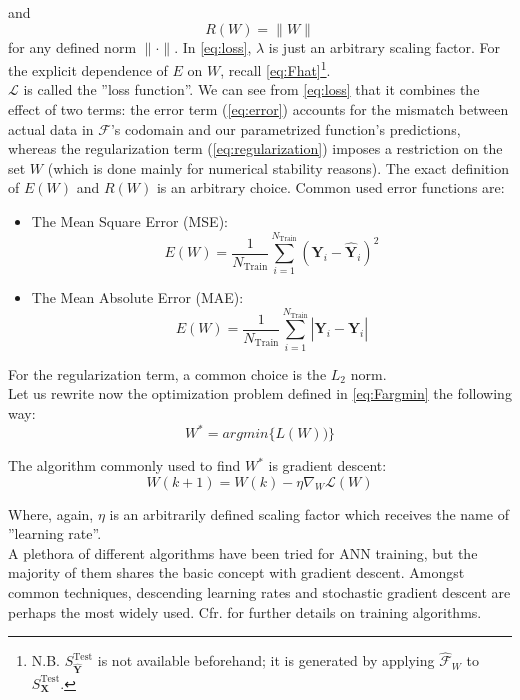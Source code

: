 and
\begin{equation}\label{eq:regularization}
	R(W) = \|W\|
\end{equation}
for any defined norm $\|\cdot\|$. In \autoref{eq:loss}, $\lambda$ is just an arbitrary scaling factor. For the explicit dependence of $E$ on $W$, recall \autoref{eq:Fhat}\footnote{N.B. $S^\text{Test}_{\mathbf{\hat{Y}}}$ is not available beforehand; it is generated by applying $\mathcal{\hat{F}}_W$ to $S^\text{Test}_{\mathbf{X}}$.}.\\
%
\indent $\mathcal{L}$ is called the ''loss function''. We can see from \autoref{eq:loss} that it combines the effect of two terms: the error term (\autoref{eq:error}) accounts for the mismatch between actual data in $\mathcal{F}$'s codomain and our parametrized function's predictions, whereas the regularization term (\autoref{eq:regularization}) imposes a restriction on the set $W$ (which is done mainly for numerical stability reasons). The exact definition of $E(W)$ and $R(W)$ is an arbitrary choice. Common used error functions are:
\begin{itemize}
	\item The Mean Square Error (MSE):
	\begin{equation}
		E(W) = \frac{1}{N_{\text{Train}}} \sum_{i=1}^{N_{\text{Train}}} (\mathbf{Y}_i - \mathbf{\hat{Y}}_i)^2
	\end{equation}
	\item The Mean Absolute Error (MAE):
	\begin{equation}
		E(W) = \frac{1}{N_{\text{Train}}} \sum_{i=1}^{N_{\text{Train}}} \left|\mathbf{Y}_i - \mathbf{\hat{Y}}_i\right|
	\end{equation}
\end{itemize}

For the regularization term, a common choice is the $L_2$ norm.\\
%
\indent Let us rewrite now the optimization problem defined in \autoref{eq:Fargmin} the following way:
\begin{equation}
	W^* = argmin\{L(W))\}
\end{equation}

The algorithm commonly used to find $W^*$ is gradient descent:
\begin{equation}
	W(k+1)=W(k)-\eta\nabla_W\mathcal{L}(W)
\end{equation}

Where, again, $\eta$ is an arbitrarily defined scaling factor which receives the name of ''learning rate''.\\
%
\indent A plethora of different algorithms have been tried for ANN training, but the majority of them shares the basic concept with gradient descent. Amongst common techniques, descending learning rates and stochastic gradient descent are perhaps the most widely used. Cfr. \cite{Marsland2015Machine} for further details on training algorithms.

